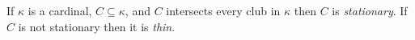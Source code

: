 \documentclass[12pt]{article}
\begin{document}
If $\kappa$ is a cardinal, $C\subseteq\kappa$, and $C$ intersects every club in $\kappa$ then $C$ is \emph{stationary}.  If $C$ is not stationary then it is \emph{thin}.
\end{document}
